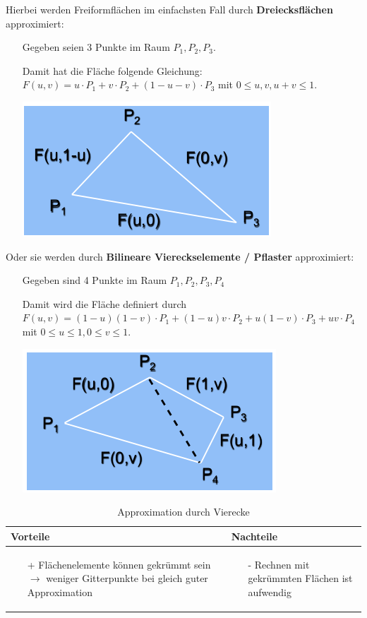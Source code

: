 Hierbei werden Freiformflächen im einfachsten Fall durch \textbf{Dreiecksflächen} approximiert:
\begin{itemize}
\item[] Gegeben seien 3 Punkte im Raum $P_1 , P_2 , P_3$.
\item[] Damit hat die Fläche folgende Gleichung: $F(u,v)=u\cdot P_1 +v\cdot P_2 +(1-u-v)\cdot P_3$ mit $0 \leq u,v, u+v \leq 1$.
\begin{center}
\includegraphics[width=.3\linewidth]{figures/ch02_dreieck.png}
\end{center}
\end{itemize}
Oder sie werden durch \textbf{Bilineare Viereckselemente / Pflaster} approximiert:
\begin{itemize}
\item[] Gegeben sind 4 Punkte im Raum $P_1 , P_2 , P_3, P_4$
\item[] Damit wird die Fläche definiert durch $F(u,v)=(1-u)(1-v) \cdot P_1 + (1-u)v \cdot P_2 + u(1-v) \cdot P_3 + uv \cdot P_4$ mit $0 \leq u \leq 1, 0 \leq v \leq 1$. 
\begin{center}
\includegraphics[width=.3\linewidth]{figures/ch02_pflaster.png}
\end{center}
\end{itemize}
\begin{table}[hbt]
\centering
\begin{tabular}{|p{6.5cm}|p{6.5cm}|}
\hline
Vorteile & Nachteile\\
\hline
\vspace{-5mm}
\begin{itemize}
\setlength\itemsep{0em}
\item[+] Flächenelemente können gekrümmt sein
$\rightarrow$ weniger Gitterpunkte bei gleich guter Approximation
\end{itemize}
 &
 \vspace{-5mm}
\begin{itemize}
\setlength\itemsep{0em}
\item[-] Rechnen mit gekrümmten Flächen ist aufwendig
\end{itemize}\\
\hline
\end{tabular}
\caption{Approximation durch Vierecke}
\label{tab:Viereck_approx}
\end{table}
